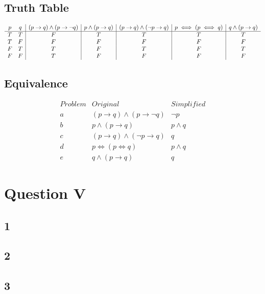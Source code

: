 \documentclass{article}
\begin{document}
\subsection*{Truth Table}
\begin{displaymath}
\begin{array}{c c|c|c|c|c|c} %
p & q & 
(p \rightarrow q) \land (p \rightarrow \neg q) & 
p \land (p \rightarrow q) & 
(p \rightarrow q) \land (\neg p \rightarrow q) &
p \iff (p \iff q) &
q \land (p \rightarrow q)
\\ 
\hline
T & T & F & T & T & T & T \\
T & F & F & F & F & F & F \\
F & T & T & F & T & F & T \\
F & F & T & F & F & F & F 
\end{array}
\end{displaymath}

\subsection*{Equivalence}
\begin{displaymath}
\begin{array}{c|c|c} %
Problem & Original & Simplified \\
\hline
a & (p \rightarrow q) \land (p \rightarrow \neg q) & \neg p \\ 
b & p \land (p \rightarrow q) & p \land q \\
c & (p \rightarrow q) \land (\neg p \rightarrow q) & q \\
d & p \iff (p \iff q) & p \land q \\
e & q \land (p \rightarrow q) & q
\end{array}
\end{displaymath}

\section*{Question V}

\subsection{1}

\subsection{2}

\subsection{3}
\end{document}
